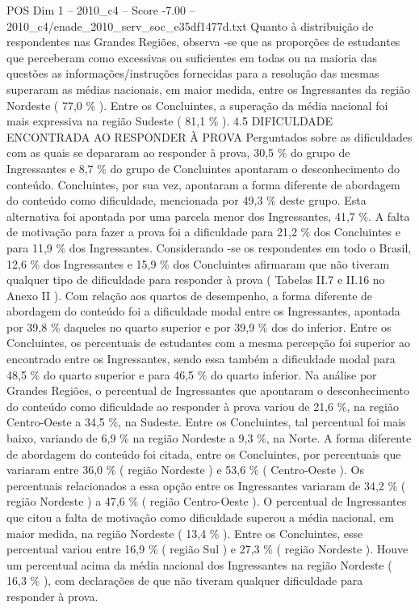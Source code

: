 \begin{textsample}{POS Dim 1 – 2010\_c4 – Score -7.00 – 2010\_c4/enade\_2010\_serv\_soc\_e35df1477d.txt}
Quanto à distribuição de respondentes nas Grandes Regiões, observa -se que as proporções de estudantes que perceberam como excessivas ou suficientes em todas ou na maioria das questões as informações/instruções fornecidas para a resolução das mesmas superaram as médias nacionais, em maior medida, entre os Ingressantes da região Nordeste ( 77,0 \% ).
Entre os Concluintes, a superação da média nacional foi mais expressiva na região Sudeste ( 81,1 \% ). 4.5 DIFICULDADE ENCONTRADA AO RESPONDER À PROVA Perguntados sobre as dificuldades com as quais se depararam ao responder à prova, 30,5 \% do grupo de Ingressantes e 8,7 \% do grupo de Concluintes apontaram o desconhecimento do conteúdo.
Concluintes, por sua vez, apontaram a forma diferente de abordagem do conteúdo como dificuldade, mencionada por 49,3 \% deste grupo.
Esta alternativa foi apontada por uma parcela menor dos Ingressantes, 41,7 \%.
A falta de motivação para fazer a prova foi a dificuldade para 21,2 \% dos Concluintes e para 11,9 \% dos Ingressantes.
Considerando -se os respondentes em todo o Brasil, 12,6 \% dos Ingressantes e 15,9 \% dos Concluintes afirmaram que não tiveram qualquer tipo de dificuldade para responder à prova ( Tabelas II.7 e II.16 no Anexo II ).
Com relação aos quartos de desempenho, a forma diferente de abordagem do conteúdo foi a dificuldade modal entre os Ingressantes, apontada por 39,8 \% daqueles no quarto superior e por 39,9 \% dos do inferior.
Entre os Concluintes, os percentuais de estudantes com a mesma percepção foi superior ao encontrado entre os Ingressantes, sendo essa também a dificuldade modal para 48,5 \% do quarto superior e para 46,5 \% do quarto inferior.
Na análise por Grandes Regiões, o percentual de Ingressantes que apontaram o desconhecimento do conteúdo como dificuldade ao responder à prova variou de 21,6 \%, na região Centro-Oeste a 34,5 \%, na Sudeste.
Entre os Concluintes, tal percentual foi mais baixo, variando de 6,9 \% na região Nordeste a 9,3 \%, na Norte.
A forma diferente de abordagem do conteúdo foi citada, entre os Concluintes, por percentuais que variaram entre 36,0 \% ( região Nordeste ) e 53,6 \% ( Centro-Oeste ).
Os percentuais relacionados a essa opção entre os Ingressantes variaram de 34,2 \% ( região Nordeste ) a 47,6 \% ( região Centro-Oeste ).
O percentual de Ingressantes que citou a falta de motivação como dificuldade superou a média nacional, em maior medida, na região Nordeste ( 13,4 \% ).
Entre os Concluintes, esse percentual variou entre 16,9 \% ( região Sul ) e 27,3 \% ( região Nordeste ).
Houve um percentual acima da média nacional dos Ingressantes na região Nordeste ( 16,3 \% ), com declarações de que não tiveram qualquer dificuldade para responder à prova.

\end{textsample}
